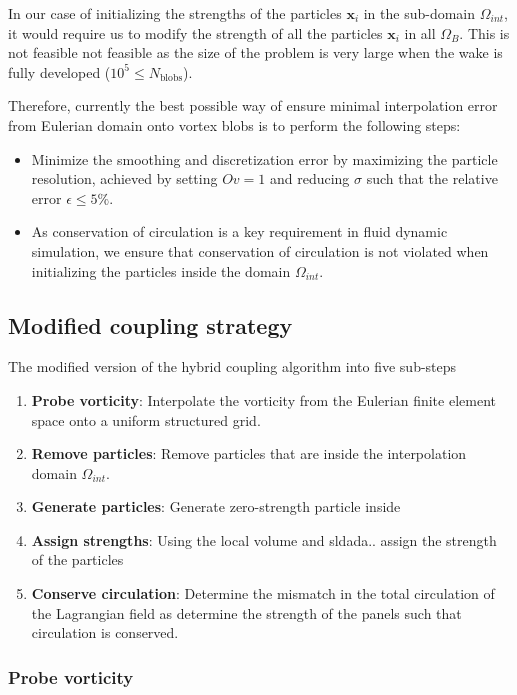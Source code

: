 In our case of initializing the strengths of the particles $\mathbf{x}_i$ in the sub-domain $\Omega_{int}$, it would require us to modify the strength of all the particles $\mathbf{x}_i$ in all $\Omega_B$. This is not feasible not feasible as the size of the problem is very large when the wake is fully developed ($10^5 \leqslant N_{\mathrm{blobs}}$).

Therefore, currently the best possible way of ensure minimal interpolation error from Eulerian domain onto vortex blobs is to perform the following steps:
\begin{itemize}
\item Minimize the smoothing and discretization error by maximizing the particle resolution, achieved by setting $Ov=1$ and reducing $\sigma$ such that the relative error $\epsilon \leqslant 5\%$.
\item As conservation of circulation is a key requirement in fluid dynamic simulation, we ensure that conservation of circulation is not violated when initializing the particles inside the domain $\Omega_{int}$.
\end{itemize}


\subsection{Modified coupling strategy}

The modified version of the hybrid coupling algorithm into five sub-steps
\begin{enumerate}
\item \textbf{Probe vorticity}: Interpolate the vorticity from the Eulerian finite element space onto a uniform structured grid.
\item \textbf{Remove particles}: Remove particles that are inside the interpolation domain $\Omega_{int}$.
\item \textbf{Generate particles}: Generate zero-strength particle inside 
\item \textbf{Assign strengths}: Using the local volume and sldada.. assign the strength of the particles
\item \textbf{Conserve circulation}: Determine the mismatch in the total circulation of the Lagrangian field as determine the strength of the panels such that circulation is conserved.
\end{enumerate}

\subsubsection*{Probe vorticity}

